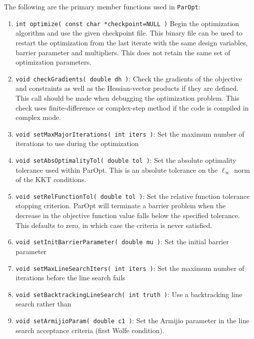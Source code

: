 \documentclass[12pt]{article}
\begin{document}
The following are the primary member functions used in \texttt{ParOpt}:
\begin{enumerate}
\item \texttt{int optimize( const char *checkpoint=NULL )} Begin the optimization algorithm and use the given checkpoint file. This binary file can be used to restart the optimization from the last iterate with the same design variables, barrier parameter and multipliers. This does not retain the same set of optimization parameters.

\item \texttt{void checkGradients( double dh )}: Check the gradients of the objective and constraints as well as the Hessian-vector products if they are defined. This call should be made when debugging the optimization problem. This check uses finite-difference or complex-step method if the code is compiled in complex mode.

\item \texttt{void setMaxMajorIterations( int iters )}: Set the maximum number of iterations to use during the optimization

\item \texttt{void setAbsOptimalityTol( double tol )}: Set the absolute optimality tolerance used within ParOpt. This is an absolute tolerance on the $\ell_{\infty}$ norm of the KKT conditions.

\item \texttt{void setRelFunctionTol( double tol )}: Set the relative function tolerance stopping criterion. ParOpt will terminate a barrier problem when the decrease in the objective function value falls below the specified tolerance. This defaults to zero, in which case the criteria is never satisfied.

\item \texttt{void setInitBarrierParameter( double mu )}: Set the initial barrier parameter

\item \texttt{void setMaxLineSearchIters( int iters )}: Set the maximum number of iterations before the line search fails

\item \texttt{void setBacktrackingLineSearch( int truth )}: Use a backtracking line search rather than 

\item \texttt{void setArmijioParam( double c1 )}: Set the Armijio parameter in the line search acceptance criteria (first Wolfe condition).


\end{enumerate}
\end{document}
